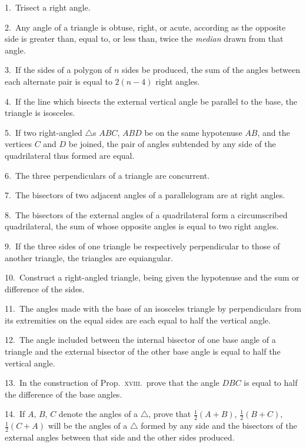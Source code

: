 \documentclass[oneside]{book}
\begin{document}
\begin{footnotesize}
1.~Trisect a right angle.

2.~Any angle of a triangle is obtuse, right, or acute, according
as the opposite side is greater than, equal to, or less than, twice
the \emph{median} drawn from that angle.

3.~If the sides of a polygon of $n$ sides be produced, the sum of
the angles between each alternate pair is equal to $2(n-4)$ right
angles.

4.~If the line which bisects the external vertical angle be
parallel to the base, the triangle is isosceles.

5.~If two right-angled $\triangle$s $ABC$, $ABD$ be on the same hypotenuse
$AB$, and the vertices $C$ and $D$ be joined, the pair of angles
subtended by any side of the quadrilateral thus formed are equal.

6.~The three perpendiculars of a triangle are concurrent.


7.~The bisectors of two adjacent angles of a parallelogram are
at right angles.

8.~The bisectors of the external angles of a quadrilateral form a
circumscribed quadrilateral, the sum of whose opposite angles is
equal to two right angles.

9.~If the three sides of one triangle be respectively perpendicular
to those of another triangle, the triangles are equiangular.

10.~Construct a right-angled triangle, being given the hypotenuse
and the sum or difference of the sides.

11.~The angles made with the base of an isosceles triangle by
perpendiculars from its extremities on the equal sides are each
equal to half the vertical angle.

12.~The angle included between the internal bisector of one
base angle of a triangle and the external bisector of the other base
angle is equal to half the vertical angle.

13.~In the construction of Prop.\ \textsc{xviii.}\ prove that the angle
$DBC$ is equal to half the difference of the base angles.

14.~If $A$, $B$, $C$ denote the angles of a $\triangle$, prove that $\frac{1}{2} (A + B)$,
$\frac{1}{2} (B + C)$, $\frac{1}{2} (C + A)$ will be the angles of a $\triangle$ formed by any
side and the bisectors of the external angles between that side and
the other sides produced.
\par\end{footnotesize}
\end{document}
